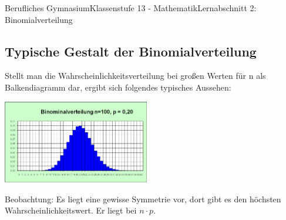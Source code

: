 \documentclass[11pt,twocolumn,oneside,openany,headings=optiontotoc,11pt,numbers=noenddot]{article}
\begin{document}
\begin{worksheet}{Berufliches Gymnasium}{Klassenstufe 13 - Mathematik}{Lernabschnitt 2: Binomialverteilung}
		\subsection{Typische Gestalt der Binomialverteilung}
		Stellt man die Wahrscheinlichkeitsverteilung bei großen Werten für n als Balkendiagramm dar, ergibt sich folgendes typisches Aussehen:\\
		\par\noindent
		\includegraphics[width=0.48\textwidth]{../99_Bilder/04_WKR/binomBalk.jpg}\\
		\par\noindent
		Beobachtung: Es liegt eine gewisse Symmetrie vor, dort gibt es den höchsten Wahrscheinlichkeitswert. Er liegt bei \(n\cdot{}p\).
	\end{worksheet}
\end{document}
